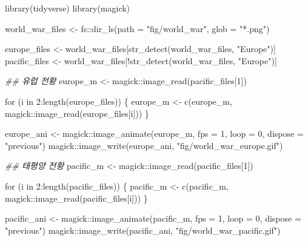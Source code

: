 \documentclass[
  letterpaper,
  chapter,a4paper,showtrims,openright,hidelinks]{oblivoir}
\newenvironment{Shaded}{\begin{snugshade}}{\end{snugshade}}
\newcommand{\AttributeTok}[1]{\textcolor[rgb]{0.40,0.45,0.13}{#1}}
\newcommand{\ControlFlowTok}[1]{\textcolor[rgb]{0.00,0.23,0.31}{#1}}
\newcommand{\DecValTok}[1]{\textcolor[rgb]{0.68,0.00,0.00}{#1}}
\newcommand{\DocumentationTok}[1]{\textcolor[rgb]{0.37,0.37,0.37}{\textit{#1}}}
\newcommand{\FunctionTok}[1]{\textcolor[rgb]{0.28,0.35,0.67}{#1}}
\newcommand{\NormalTok}[1]{\textcolor[rgb]{0.00,0.23,0.31}{#1}}
\newcommand{\OtherTok}[1]{\textcolor[rgb]{0.00,0.23,0.31}{#1}}
\newcommand{\SpecialCharTok}[1]{\textcolor[rgb]{0.37,0.37,0.37}{#1}}
\newcommand{\StringTok}[1]{\textcolor[rgb]{0.13,0.47,0.30}{#1}}
\begin{document}
\begin{Shaded}
\begin{Highlighting}[]
\FunctionTok{library}\NormalTok{(tidyverse)}
\FunctionTok{library}\NormalTok{(magick)}

\NormalTok{world\_war\_files }\OtherTok{\textless{}{-}}\NormalTok{ fs}\SpecialCharTok{::}\FunctionTok{dir\_ls}\NormalTok{(}\AttributeTok{path =} \StringTok{"fig/world\_war"}\NormalTok{, }\AttributeTok{glob =} \StringTok{"*.png"}\NormalTok{)}

\NormalTok{europe\_files }\OtherTok{\textless{}{-}}\NormalTok{ world\_war\_files[}\FunctionTok{str\_detect}\NormalTok{(world\_war\_files, }\StringTok{"Europe"}\NormalTok{)]}
\NormalTok{pacific\_files }\OtherTok{\textless{}{-}}\NormalTok{ world\_war\_files[}\SpecialCharTok{!}\FunctionTok{str\_detect}\NormalTok{(world\_war\_files, }\StringTok{"Europe"}\NormalTok{)]}

\DocumentationTok{\#\# 유럽 전황 }
\NormalTok{europe\_m }\OtherTok{\textless{}{-}}\NormalTok{ magick}\SpecialCharTok{::}\FunctionTok{image\_read}\NormalTok{(pacific\_files[}\DecValTok{1}\NormalTok{])}

\ControlFlowTok{for}\NormalTok{ (i }\ControlFlowTok{in} \DecValTok{2}\SpecialCharTok{:}\FunctionTok{length}\NormalTok{(europe\_files)) \{}
\NormalTok{  europe\_m }\OtherTok{\textless{}{-}} \FunctionTok{c}\NormalTok{(europe\_m, magick}\SpecialCharTok{::}\FunctionTok{image\_read}\NormalTok{(europe\_files[i]))}
\NormalTok{\}}

\NormalTok{europe\_ani }\OtherTok{\textless{}{-}}\NormalTok{ magick}\SpecialCharTok{::}\FunctionTok{image\_animate}\NormalTok{(europe\_m, }\AttributeTok{fps =} \DecValTok{1}\NormalTok{, }\AttributeTok{loop =} \DecValTok{0}\NormalTok{, }\AttributeTok{dispose =} \StringTok{"previous"}\NormalTok{)}
\NormalTok{magick}\SpecialCharTok{::}\FunctionTok{image\_write}\NormalTok{(europe\_ani, }\StringTok{"fig/world\_war\_europe.gif"}\NormalTok{)}

\DocumentationTok{\#\# 태평양 전황 }
\NormalTok{pacific\_m }\OtherTok{\textless{}{-}}\NormalTok{ magick}\SpecialCharTok{::}\FunctionTok{image\_read}\NormalTok{(pacific\_files[}\DecValTok{1}\NormalTok{])}

\ControlFlowTok{for}\NormalTok{ (i }\ControlFlowTok{in} \DecValTok{2}\SpecialCharTok{:}\FunctionTok{length}\NormalTok{(pacific\_files)) \{}
\NormalTok{  pacific\_m }\OtherTok{\textless{}{-}} \FunctionTok{c}\NormalTok{(pacific\_m, magick}\SpecialCharTok{::}\FunctionTok{image\_read}\NormalTok{(pacific\_files[i]))}
\NormalTok{\}}

\NormalTok{pacific\_ani }\OtherTok{\textless{}{-}}\NormalTok{ magick}\SpecialCharTok{::}\FunctionTok{image\_animate}\NormalTok{(pacific\_m, }\AttributeTok{fps =} \DecValTok{1}\NormalTok{, }\AttributeTok{loop =} \DecValTok{0}\NormalTok{, }\AttributeTok{dispose =} \StringTok{"previous"}\NormalTok{)}
\NormalTok{magick}\SpecialCharTok{::}\FunctionTok{image\_write}\NormalTok{(pacific\_ani, }\StringTok{"fig/world\_war\_pacific.gif"}\NormalTok{)}
\end{Highlighting}
\end{Shaded}
\end{document}
